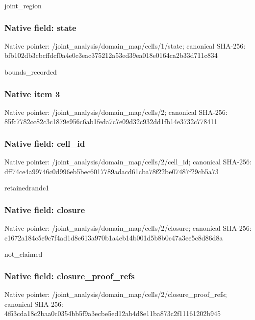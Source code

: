 \documentclass[10pt,a4paper]{article}
\begin{document}
joint\_region


\subsubsection{Native field: state}


Native pointer: /joint\_analysis/domain\_m\allowbreak{}ap/cells/1/state; canonical SHA-256: bfb102db3cbcffdcf0a4e0c3\allowbreak{}eac375212a53ed39ea018e01\allowbreak{}64ca2b33d711c834


bounds\_recorded


\subsubsection{Native item 3}


Native pointer: /joint\_analysis/domain\_map/cells/2; canonical SHA-256: 85fc7782cc82c3c1879e956c\allowbreak{}6ab1feda7c7e09d32c932dd1\allowbreak{}fb14e3732c778411



\subsubsection{Native field: cell\_id}


Native pointer: /joint\_analysis/domain\_m\allowbreak{}ap/cells/2/cell\_id; canonical SHA-256: dff74ce4a99746c0d996eb5b\allowbreak{}ec6017789adacd61cba78f22\allowbreak{}be07487f29cb5a73


retainedrandc1


\subsubsection{Native field: closure}


Native pointer: /joint\_analysis/domain\_m\allowbreak{}ap/cells/2/closure; canonical SHA-256: c1672a184c5e9c7f4ad1d8e6\allowbreak{}13a970b1a4eb14b001d5b8b0\allowbreak{}c47a3ee5c8d86d8a


not\_claimed


\subsubsection{Native field: closure\_proof\_refs}


Native pointer: /joint\_analysis/domain\_m\allowbreak{}ap/cells/2/closure\_proof\allowbreak{}\_refs; canonical SHA-256: 4f53cda18c2baa0c0354bb5f\allowbreak{}9a3ecbe5ed12ab4d8e11ba87\allowbreak{}3c2f11161202b945
\end{document}
